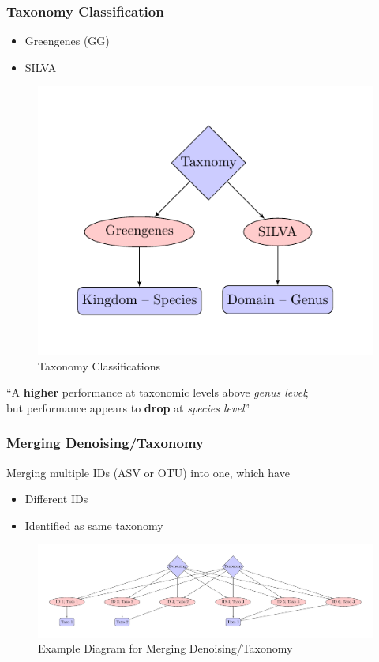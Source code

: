 \documentclass{beamer}
\begin{document}
    \begin{frame}
        \frametitle{Taxonomy Classification}

        \begin{itemize}
            \item Greengenes (GG) \cite{greengenes1}
            \item SILVA \cite{silva1, silva2}
        \end{itemize}

        \begin{figure}
            \includegraphics[width=0.4 \linewidth]{figures/tikz/taxonomy.pdf}
            \caption{Taxonomy Classifications}
        \end{figure}

        “A \textbf{higher} performance at taxonomic levels above \textit{genus level}; \\
        but performance appears to \textbf{drop} at \textit{species level}” \cite{performance1}
    \end{frame}

    \begin{frame}
        \frametitle{Merging Denoising/Taxonomy}

        Merging multiple IDs (ASV or OTU) into one, which have
        \begin{itemize}
            \item Different IDs
            \item Identified as same taxonomy
        \end{itemize}

        \begin{figure}
            \includegraphics[width=0.8 \linewidth]{figures/tikz/merging.pdf}
            \caption{Example Diagram for Merging Denoising/Taxonomy}
        \end{figure}
    \end{frame}
\end{document}
